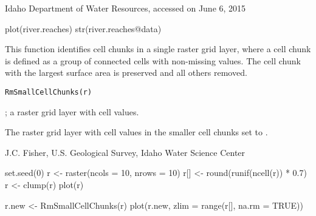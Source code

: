 \documentclass[a4paper]{book}
\begin{document}
%
\begin{Source}\relax
Idaho Department of Water Resources, accessed on June 6, 2015
\end{Source}
%
\begin{Examples}
\begin{ExampleCode}
plot(river.reaches)
str(river.reaches@data)
\end{ExampleCode}
\end{Examples}
%
\begin{Description}\relax
This function identifies cell chunks in a single raster grid layer,
where a cell chunk is defined as a group of connected cells with non-missing values.
The cell chunk with the largest surface area is preserved and all others removed.
\end{Description}
%
\begin{Usage}
\begin{verbatim}
RmSmallCellChunks(r)
\end{verbatim}
\end{Usage}
%
\begin{Arguments}
\begin{ldescription}
\item[\code{r}] ; a raster grid layer with cell values.
\end{ldescription}
\end{Arguments}
%
\begin{Value}
The raster grid layer  with cell values in the smaller cell chunks set to .
\end{Value}
%
\begin{Author}\relax
J.C. Fisher, U.S. Geological Survey, Idaho Water Science Center
\end{Author}
%
\begin{SeeAlso}\relax
{}
\end{SeeAlso}
%
\begin{Examples}
\begin{ExampleCode}
set.seed(0)
r <- raster(ncols = 10, nrows = 10)
r[] <- round(runif(ncell(r)) * 0.7)
r <- clump(r)
plot(r)

r.new <- RmSmallCellChunks(r)
plot(r.new, zlim = range(r[], na.rm = TRUE))
\end{ExampleCode}
\end{Examples}
\end{document}

